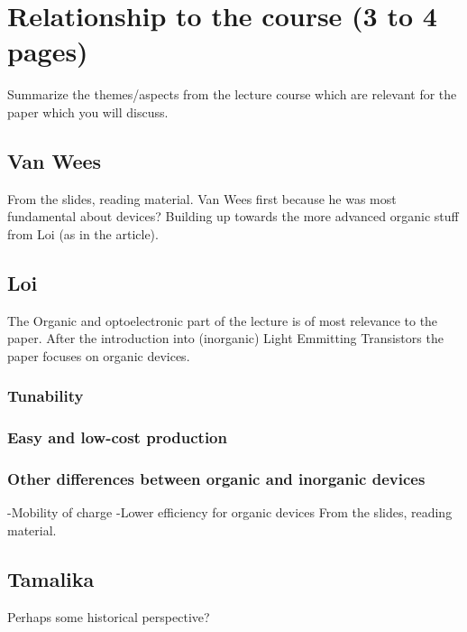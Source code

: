 \section{Relationship to the course (3 to 4 pages)}
Summarize the themes/aspects from the lecture course which are relevant for the paper which you will discuss. 



\subsection{Van Wees}
From the slides, reading material. Van Wees first because he was most fundamental about devices? Building up towards the more advanced organic stuff from Loi (as in the article).



\subsection{Loi}
The Organic and optoelectronic part of the lecture is of most relevance to the paper. After the introduction into (inorganic) Light Emmitting Transistors the paper focuses on organic devices. 

\subsubsection{Tunability}
\subsubsection{Easy and low-cost production}
\subsubsection{Other differences between organic and inorganic devices}
-Mobility of charge
-Lower efficiency for organic devices
From the slides, reading material.



\subsection{Tamalika}
Perhaps some historical perspective?

